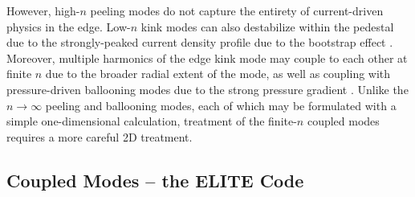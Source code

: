 \begin{figure}
 \pushtooutside
\end{figure}

However, high-$n$ peeling modes do not capture the entirety of current-driven physics in the edge.  Low-$n$ kink modes can also destabilize within the pedestal due to the strongly-peaked current density profile due to the bootstrap effect \cite{Snyder2002}.  Moreover, multiple harmonics of the edge kink mode may couple to each other at finite $n$ due to the broader radial extent of the mode, as well as coupling with pressure-driven ballooning modes due to the strong pressure gradient \cite{Wilson1999,Snyder2004}.  Unlike the $n \rightarrow \infty$ peeling and ballooning modes, each of which may be formulated with a simple one-dimensional calculation, treatment of the finite-$n$ coupled modes requires a more careful 2D treatment.

\subsection{Coupled Modes -- the ELITE Code}\label{subsec:mod_elite}

